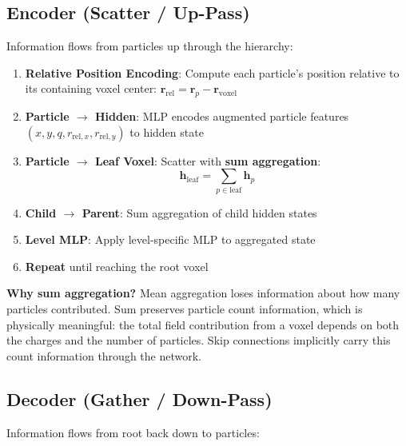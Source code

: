 \documentclass[11pt,a4paper]{article}
\begin{document}
\subsection{Encoder (Scatter / Up-Pass)}

Information flows from particles up through the hierarchy:

\begin{enumerate}
    \item \textbf{Relative Position Encoding}: Compute each particle's position relative to its containing voxel center: $\mathbf{r}_{\text{rel}} = \mathbf{r}_p - \mathbf{r}_{\text{voxel}}$
    \item \textbf{Particle $\to$ Hidden}: MLP encodes augmented particle features $(x, y, q, r_{\text{rel},x}, r_{\text{rel},y})$ to hidden state
    \item \textbf{Particle $\to$ Leaf Voxel}: Scatter with \textbf{sum aggregation}:
    \begin{equation}
        \mathbf{h}_{\text{leaf}} = \sum_{p \in \text{leaf}} \mathbf{h}_p
    \end{equation}
    \item \textbf{Child $\to$ Parent}: Sum aggregation of child hidden states
    \item \textbf{Level MLP}: Apply level-specific MLP to aggregated state
    \item \textbf{Repeat} until reaching the root voxel
\end{enumerate}

\textbf{Why sum aggregation?} Mean aggregation loses information about how many particles contributed. Sum preserves particle count information, which is physically meaningful: the total field contribution from a voxel depends on both the charges and the number of particles. Skip connections implicitly carry this count information through the network.

\subsection{Decoder (Gather / Down-Pass)}

Information flows from root back down to particles:
\end{document}

